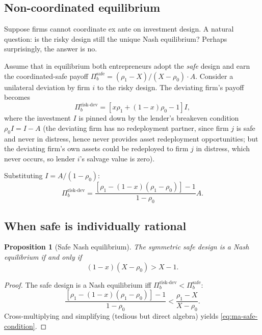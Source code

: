 \documentclass[11pt,a4paper,oneside]{book}
\theoremstyle{plain}
\newtheorem{proposition}[theorem]{Proposition}
\theoremstyle{definition}
\theoremstyle{remark}
\numberwithin{equation}{chapter}
\begin{document}
\subsection{Non-coordinated equilibrium}

Suppose firms cannot coordinate ex ante on investment design.
A natural question: is the risky design still the unique Nash equilibrium?
Perhaps surprisingly, the answer is no.

Assume that in equilibrium both entrepreneurs adopt the \emph{safe} design and earn the coordinated-safe payoff $\Pi_b^{\text{safe}} = (\rho_1 - X)/(X - \rho_0) \cdot A$.
Consider a unilateral deviation by firm $i$ to the risky design.
The deviating firm's payoff becomes
\begin{equation*}
  \Pi_b^{\text{risk-dev}} = [x \rho_1 + (1 - x) \rho_0 - 1] I,
\end{equation*}
where the investment $I$ is pinned down by the lender's breakeven condition $\rho_0 I = I - A$ (the deviating firm has no redeployment partner, since firm $j$ is safe and never in distress, hence never provides asset redeployment opportunities; but the deviating firm's own assets could be redeployed to firm $j$ in distress, which never occurs, so lender $i$'s salvage value is zero).

Substituting $I = A/(1 - \rho_0)$:
\begin{equation}\label{eq:ma-risk-dev}
  \Pi_b^{\text{risk-dev}} = \frac{[\rho_1 - (1 - x)(\rho_1 - \rho_0)] - 1}{1 - \rho_0} A.
\end{equation}

\subsection{When safe is individually rational}

\begin{proposition}[Safe Nash equilibrium]\label{prop:ma-safe-NE}
The symmetric safe design is a Nash equilibrium if and only if
\begin{equation}\label{eq:ma-safe-condition}
  (1 - x)(X - \rho_0) > X - 1.
\end{equation}
\end{proposition}

\begin{proof}
The safe design is a Nash equilibrium iff $\Pi_b^{\text{risk-dev}} < \Pi_b^{\text{safe}}$:
\begin{equation*}
  \frac{[\rho_1 - (1 - x)(\rho_1 - \rho_0)] - 1}{1 - \rho_0} < \frac{\rho_1 - X}{X - \rho_0}.
\end{equation*}
Cross-multiplying and simplifying (tedious but direct algebra) yields \eqref{eq:ma-safe-condition}.
\end{proof}
\end{document}
